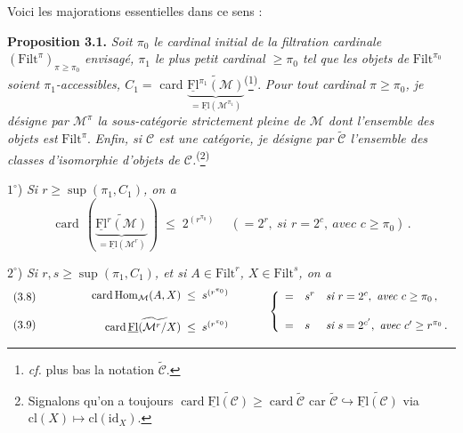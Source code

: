 \documentclass[11pt]{article}
\newcommand{\msp}[1]{\marginpar{\footnotesize [#1]}}
\newcommand{\uFl}{\underline{\mathrm{Fl}}}
\newcommand{\Filt}{\mathrm{Filt}}
\newcommand{\cM}{\mathcal{M}}
\newcommand{\card}{\operatorname{card}}
\newcommand{\pfn}[2]{\textsuperscript{(}\footnote[#1]{#2}\textsuperscript{)}}
\begin{document}
\msp{page 19}

Voici les majorations essentielles dans ce sens :

\textbf{Proposition 3.1.} \textit{Soit $\pi_0$ le cardinal initial de la filtration cardinale} $(\Filt^\pi)_{\pi\geq\pi_0}$ \textit{envisagé, $\pi_1$ le plus petit cardinal $\geq\pi_0$ tel que les objets de} $\Filt^{\pi_0}$ \textit{soient $\pi_1$-accessibles, $C_1=$} card $\underbrace{\widetilde{\uFl^{\pi_1}(\cM)}}_{=\uFl(\cM^{\pi_1})}$\pfn{4}{\textit{cf.} plus bas la notation $\widetilde{\mathcal{C}}$.}. \textit{Pour tout cardinal $\pi\geq\pi_0$, je désigne par $\cM^\pi$ la sous-catégorie strictement pleine de $\cM$ dont l'ensemble des objets est} $\Filt^\pi$. \textit{Enfin, si $\mathcal{C}$ est une catégorie, je désigne par $\widetilde{\mathcal{C}}$ l'ensemble des classes d'isomorphie d'objets de $\mathcal{C}$.}\pfn{5}{Signalons qu'on a toujours $\card\widetilde{\uFl(\mathcal{C})}\geq\card\widetilde{\mathcal{C}}$ car $\widetilde{\mathcal{C}}\hookrightarrow\widetilde{\uFl(\mathcal{C})}$ via $\mathrm{cl}(X)\longmapsto\mathrm{cl}(\mathrm{id}_X)$.}

$1^\circ$) \textit{Si $r\geq\sup(\pi_1,C_1)$, on a}
\[
\card\,(\underbrace{\widetilde{\uFl^r(\cM)}}_{=\uFl(\cM^r)}) \;\leq\; 2^{(r^{\pi_0})} \quad\ (=2^r,\ \textit{si } r=2^c,\ \textit{avec } c\geq\pi_0)\,.
\tag*{(3.7)}
\]

$2^\circ$) \textit{Si $r,s\geq\sup(\pi_1,C_1)$, et si $A\in\Filt^r$, $X\in\Filt^s$, on a}
\[
\begin{array}{l}
\text{(3.8)}\\[3ex]
\text{(3.9)}
\end{array}
\qquad\qquad
\begin{array}{r@{\;\;\leq\;\;}l}
\card\mathrm{Hom}_{\cM}(A,X) & s^{(r^{\pi_0})}\\[3ex]
\card\widetilde{\uFl(\cM^r/X)} & s^{(r^{\pi_0})}
\end{array}
\qquad\quad
\left\{
\begin{array}{lll}
= & s^r & \textit{si } r=2^c,\ \textit{avec } c\geq\pi_0\,,\\[3ex]
= & s & \textit{si } s=2^{c'},\ \textit{avec } c'\geq r^{\pi_0}\,.
\end{array}
\right.
\]
\end{document}
